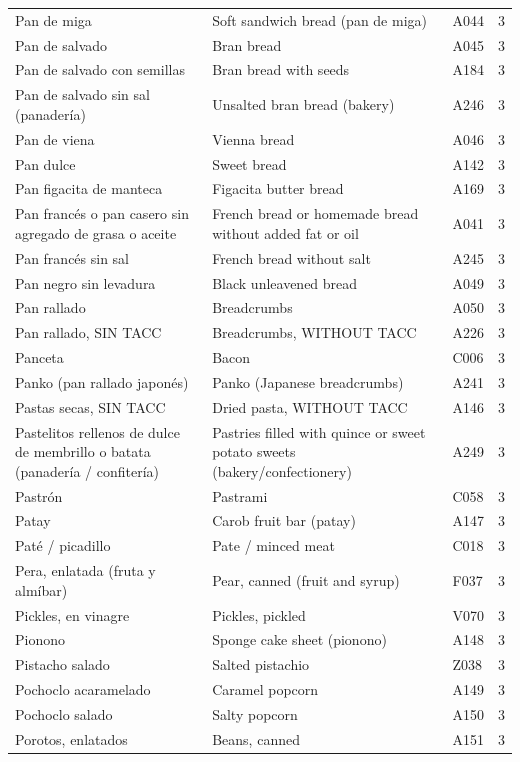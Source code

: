 {\begin{longtable}{p{4.3cm}p{5.5cm}p{1.5cm}p{0.7cm}}
Pan de miga & Soft sandwich bread (pan de miga) & A044 & 3\\
Pan de salvado & Bran bread & A045 & 3\\
Pan de salvado con semillas & Bran bread with seeds & A184 & 3\\
Pan de salvado sin sal (panadería) & Unsalted bran bread (bakery) & A246 & 3\\
Pan de viena & Vienna bread & A046 & 3\\
Pan dulce & Sweet bread & A142 & 3\\
Pan figacita de manteca & Figacita butter bread & A169 & 3\\
Pan francés o pan casero sin agregado de grasa o aceite & French bread or homemade bread without added fat or oil & A041 & 3\\
Pan francés sin sal & French bread without salt & A245 & 3\\
Pan negro sin levadura & Black unleavened bread & A049 & 3\\
Pan rallado & Breadcrumbs & A050 & 3\\
Pan rallado, SIN TACC & Breadcrumbs, WITHOUT TACC & A226 & 3\\
Panceta & Bacon & C006 & 3\\
Panko (pan rallado japonés) & Panko (Japanese breadcrumbs) & A241 & 3\\
Pastas secas, SIN TACC & Dried pasta, WITHOUT TACC & A146 & 3\\
Pastelitos rellenos de dulce de membrillo o batata (panadería / confitería) & Pastries filled with quince or sweet potato sweets (bakery/confectionery) & A249 & 3\\
Pastrón & Pastrami & C058 & 3\\
Patay & Carob fruit bar (patay) & A147 & 3\\
Paté / picadillo & Pate / minced meat & C018 & 3\\
Pera, enlatada (fruta y almíbar) & Pear, canned (fruit and syrup) & F037 & 3\\
Pickles, en vinagre & Pickles, pickled & V070 & 3\\
Pionono & Sponge cake sheet (pionono) & A148 & 3\\
Pistacho salado & Salted pistachio & Z038 & 3\\
Pochoclo acaramelado & Caramel popcorn & A149 & 3\\
Pochoclo salado & Salty popcorn & A150 & 3\\
Porotos, enlatados & Beans, canned & A151 & 3\\

\end{longtable}}
